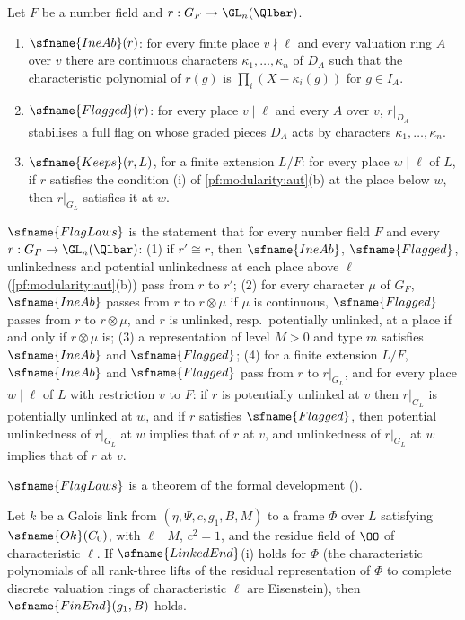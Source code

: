 \begin{definition}\label{pf:modularity:loccond}
Let $F$ be a number field and $r:G_F\to\GL_n(\Qlbar)$.
\begin{enumerate}[label=(\alph*)]
\item $\sfname{IneAb}(r)$: for every finite place $v\nmid\ell$ and every valuation ring $A$ over $v$ there are continuous
characters $\kappa_1,\dots,\kappa_n$ of $D_A$ such that the characteristic polynomial of $r(g)$ is
$\prod_i(X-\kappa_i(g))$ for $g\in I_A$.
\item $\sfname{Flagged}(r)$: for every place $v\mid\ell$ and every $A$ over $v$, $r|_{D_A}$ stabilises a full flag on
whose graded pieces $D_A$ acts by characters $\kappa_1,\dots,\kappa_n$.
\item $\sfname{Keeps}(r,L)$, for a finite extension $L/F$: for every place $w\mid\ell$ of $L$, if $r$ satisfies the
condition (i) of \cref{pf:modularity:aut}(b) at the place below $w$, then $r|_{G_L}$ satisfies it at $w$.
\end{enumerate}
$\sfname{FlagLaws}$ is the statement that for every number field $F$ and every $r:G_F\to\GL_n(\Qlbar)$: (1) if $r'\cong r$,
then $\sfname{IneAb}$, $\sfname{Flagged}$, unlinkedness and potential unlinkedness at each place above $\ell$
(\cref{pf:modularity:aut}(b)) pass from $r$ to $r'$; (2) for every character $\mu$ of $G_F$, $\sfname{IneAb}$ passes from
$r$ to $r\otimes\mu$ if $\mu$ is continuous, $\sfname{Flagged}$ passes from $r$ to $r\otimes\mu$, and $r$ is unlinked,
resp.\ potentially unlinked, at a place if and only if $r\otimes\mu$ is; (3) a representation of level $M>0$ and type $m$
satisfies $\sfname{IneAb}$ and $\sfname{Flagged}$; (4) for a finite extension $L/F$, $\sfname{IneAb}$ and $\sfname{Flagged}$
pass from $r$ to $r|_{G_L}$, and for every place $w\mid\ell$ of $L$ with restriction $v$ to $F$: if $r$ is potentially
unlinked at $v$ then $r|_{G_L}$ is potentially unlinked at $w$, and if $r$ satisfies $\sfname{Flagged}$, then potential
unlinkedness of $r|_{G_L}$ at $w$ implies that of $r$ at $v$, and unlinkedness of $r|_{G_L}$ at $w$ implies that of $r$ at $v$.
\end{definition}

$\sfname{FlagLaws}$ is a theorem of the formal development ().

\begin{lemma}\label{pf:modularity:finendpt}
Let $k$ be a Galois link from $(\eta,\Psi,c,g_1,B,M)$ to a frame $\Phi$ over $L$ satisfying $\sfname{Ok}(C_0)$, with
$\ell\mid M$, $c^2=1$, and the residue field of $\OO$ of characteristic $\ell$. If $\sfname{LinkedEnd}$(i) holds for
$\Phi$ (the characteristic polynomials of all rank-three lifts of the residual representation of $\Phi$ to complete
discrete valuation rings of characteristic $\ell$ are Eisenstein), then $\sfname{FinEnd}(g_1,B)$ holds.
\end{lemma}


